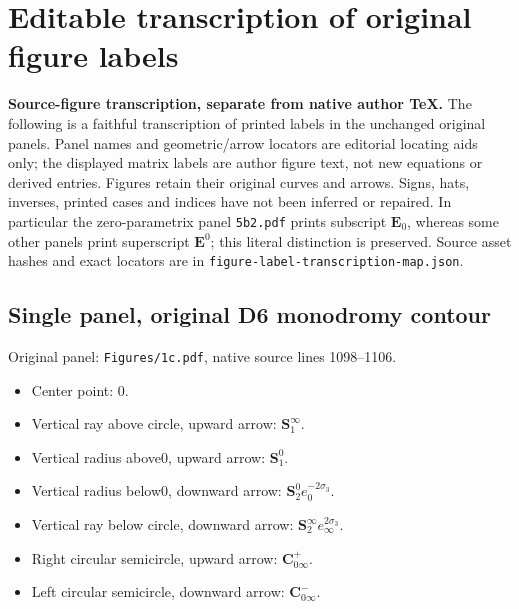 \clearpage
\section*{Editable transcription of original figure labels}
\noindent\textbf{Source-figure transcription, separate from native author TeX.} The following is a faithful transcription of printed labels in the unchanged original panels. Panel names and geometric/arrow locators are editorial locating aids only; the displayed matrix labels are author figure text, not new equations or derived entries. Figures retain their original curves and arrows. Signs, hats, inverses, printed cases and indices have not been inferred or repaired. In particular the zero-parametrix panel \texttt{5b2.pdf} prints subscript $\mathbf{E}_0$, whereas some other panels print superscript $\mathbf{E}^{0}$; this literal distinction is preserved. Source asset hashes and exact locators are in \texttt{figure-label-transcription-map.json}.

\subsection*{Single panel, original D6 monodromy contour}
\noindent Original panel: \texttt{Figures/1c.pdf}, native source lines 1098--1106.
\begin{itemize}\itemsep=0pt
\item Center point: $0$.
\item Vertical ray above circle, upward arrow: $\mathbf{S}_1^\infty{}$.
\item Vertical radius above0, upward arrow: $\mathbf{S}_1^0{}$.
\item Vertical radius below0, downward arrow: $\mathbf{S}_2^0{}e_0^{-2\sigma_3}$.
\item Vertical ray below circle, downward arrow: $\mathbf{S}_2^\infty{}e_\infty^{2\sigma_3}$.
\item Right circular semicircle, upward arrow: $\mathbf{C}_{0\infty}^{+}{}$.
\item Left circular semicircle, downward arrow: $\mathbf{C}_{0\infty}^{-}{}$.
\end{itemize}

